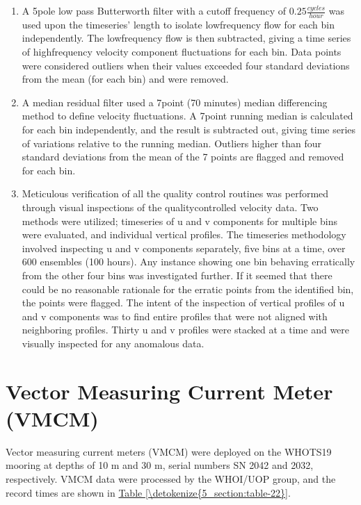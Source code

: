 \documentclass[a4paper,10pt,english,openany,oneside]{sphinxmanual}
\begin{document}
\begin{enumerate}
\item {} 
\sphinxAtStartPar
A 5\sphinxhyphen{}pole low pass Butterworth filter with a cutoff frequency of
\(0.25 \frac{cycles}{hour}\) was used upon the time\sphinxhyphen{}series’ length to
isolate low\sphinxhyphen{}frequency flow for each bin independently. The low\sphinxhyphen{}frequency
flow is then subtracted, giving a time series of high\sphinxhyphen{}frequency velocity
component fluctuations for each bin. Data points were considered outliers
when their values exceeded four standard deviations from the mean (for each
bin) and were removed.

\item {} 
\sphinxAtStartPar
A median residual filter used a 7\sphinxhyphen{}point (70 minutes) median differencing
method to define velocity fluctuations. A 7\sphinxhyphen{}point running median is
calculated for each bin independently, and the result is subtracted out,
giving time series of variations relative to the running median. Outliers
higher than four standard deviations from the mean of the 7 points are
flagged and removed for each bin.

\item {} 
\sphinxAtStartPar
Meticulous verification of all the quality control routines was performed
through visual inspections of the quality\sphinxhyphen{}controlled velocity data. Two
methods were utilized; time\sphinxhyphen{}series of u and v components for multiple bins
were evaluated, and individual vertical profiles. The time\sphinxhyphen{}series
methodology involved inspecting u and v components separately, five bins at
a time, over 600 ensembles (100 hours). Any instance showing one bin
behaving erratically from the other four bins was investigated further. If
it seemed that there could be no reasonable rationale for the erratic
points from the identified bin, the points were flagged. The intent of the
inspection of vertical profiles of u and v components was to find entire
profiles that were not aligned with neighboring profiles. Thirty u and v
profiles were stacked at a time and were visually inspected for any
anomalous data.

\end{enumerate}


\section{Vector Measuring Current Meter (VMCM)}
\label{\detokenize{5_section:vector-measuring-current-meter-vmcm}}
\sphinxAtStartPar
Vector measuring current meters (VMCM) were deployed on the WHOTS\sphinxhyphen{}19 mooring at
depths of 10 m and 30 m, serial numbers SN 2042 and 2032, respectively. VMCM
data were processed by the WHOI/UOP group, and the record times are shown
in \hyperref[\detokenize{5_section:table-22}]{Table \ref{\detokenize{5_section:table-22}}}.
\end{document}
